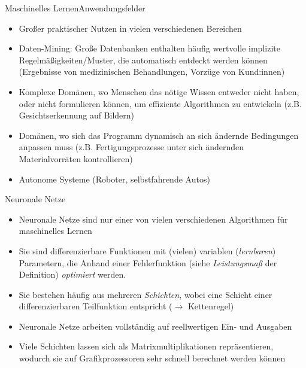 \documentclass[aspectratio=169,10pt]{beamer}
\begin{document}
\begin{frame}{Maschinelles Lernen}{Anwendungsfelder}
    \begin{itemize}
        \item Großer praktischer Nutzen in vielen verschiedenen Bereichen
        \item Daten-Mining: Große Datenbanken enthalten häufig wertvolle implizite Regelmäßigkeiten/Muster, die automatisch entdeckt werden können (Ergebnisse von medizinischen Behandlungen, Vorzüge von Kund:innen)
        \item Komplexe Domänen, wo Menschen das nötige Wissen entweder nicht haben, oder nicht formulieren können, um effiziente Algorithmen zu entwickeln (z.B. Gesichtserkennung auf Bildern)
        \item Domänen, wo sich das Programm dynamisch an sich ändernde Bedingungen anpassen muss (z.B. Fertigungsprozesse unter sich ändernden Materialvorräten kontrollieren)
        \item Autonome Systeme (Roboter, selbstfahrende Autos)
    \end{itemize}
\end{frame}

\begin{frame}{Neuronale Netze}
    \begin{itemize}
        \item Neuronale Netze sind nur einer von vielen verschiedenen Algorithmen für maschinelles Lernen
        \item Sie sind differenzierbare Funktionen mit (vielen) variablen (\emph{lernbaren}) Parametern, die Anhand einer Fehlerfunktion (siehe \emph{Leistungsmaß} der Definition) \emph{optimiert} werden.
        \item Sie bestehen häufig aus mehreren \emph{Schichten}, wobei eine Schicht einer differenzierbaren Teilfunktion entspricht ($\rightarrow$ Kettenregel)
        \item Neuronale Netze arbeiten vollständig auf reellwertigen Ein- und Ausgaben
        \item Viele Schichten lassen sich als Matrixmultiplikationen repräsentieren, wodurch sie auf Grafikprozessoren sehr schnell berechnet werden können
    \end{itemize}
\end{frame}
\end{document}
